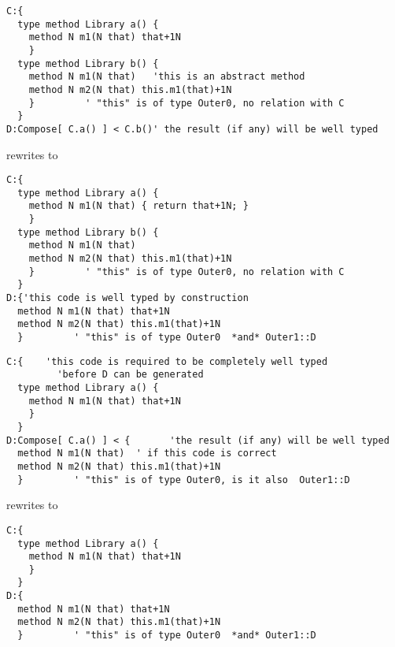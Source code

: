 \begin{frame}[fragile]
\begin{NiceCode}{59ex}{0.8}
\begin{lstlisting}
C:{  
  type method Library a() {
    method N m1(N that) that+1N
    }
  type method Library b() {
    method N m1(N that)   'this is an abstract method
    method N m2(N that) this.m1(that)+1N
    }         ' "this" is of type Outer0, no relation with C
  }
D:Compose[ C.a() ] < C.b()' the result (if any) will be well typed
\end{lstlisting}
\end{NiceCode}
rewrites to 

\begin{NiceCode}{59ex}{0.8}
\begin{lstlisting}
C:{
  type method Library a() {
    method N m1(N that) { return that+1N; }
    }
  type method Library b() {
    method N m1(N that)  
    method N m2(N that) this.m1(that)+1N
    }         ' "this" is of type Outer0, no relation with C
  }
D:{'this code is well typed by construction
  method N m1(N that) that+1N
  method N m2(N that) this.m1(that)+1N
  }         ' "this" is of type Outer0  *and* Outer1::D
\end{lstlisting}
\end{NiceCode}
\end{frame}



\begin{frame}[fragile]
\begin{NiceCode}{59ex}{0.8}
\begin{lstlisting}
C:{    'this code is required to be completely well typed 
         'before D can be generated
  type method Library a() {
    method N m1(N that) that+1N
    }
  }
D:Compose[ C.a() ] < {       'the result (if any) will be well typed
  method N m1(N that)  ' if this code is correct
  method N m2(N that) this.m1(that)+1N
  }         ' "this" is of type Outer0, is it also  Outer1::D
\end{lstlisting}
\end{NiceCode}
rewrites to 

\begin{NiceCode}{59ex}{0.8}
\begin{lstlisting}
C:{  
  type method Library a() {
    method N m1(N that) that+1N
    }
  }
D:{
  method N m1(N that) that+1N
  method N m2(N that) this.m1(that)+1N
  }         ' "this" is of type Outer0  *and* Outer1::D
\end{lstlisting}
\end{NiceCode}
\end{frame}


